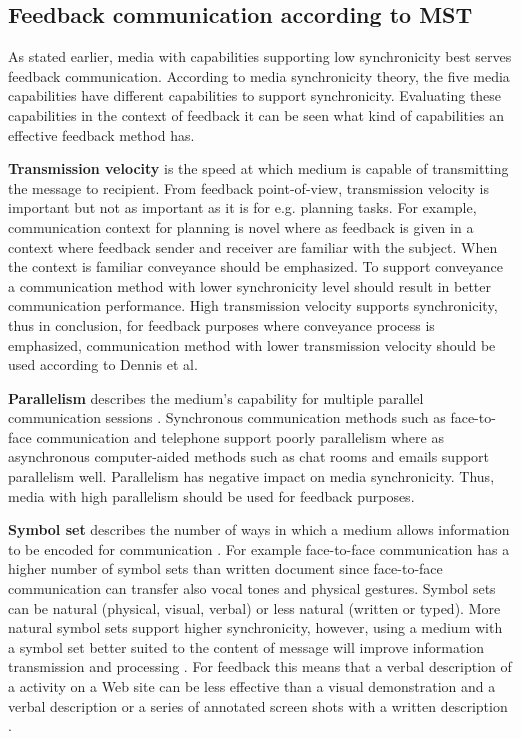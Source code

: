 \documentclass[conference]{IEEEtran}
\begin{document}
\subsection{Feedback communication according to MST}

As stated earlier, media with capabilities supporting low synchronicity best serves feedback communication. According to media synchronicity theory, the five media capabilities have different capabilities to support synchronicity. Evaluating these capabilities in the context of feedback it can be seen what kind of capabilities an effective feedback method has.

\textbf{Transmission velocity} is the speed at which medium is capable of transmitting the message to recipient. From feedback point-of-view, transmission velocity is important but not as important as it is for e.g. planning tasks. For example, communication context for planning is novel where as feedback is given in a context where feedback sender and receiver are familiar with the subject. When the context is familiar conveyance should be emphasized. To support conveyance a communication method with lower synchronicity level should result in better communication performance. High transmission velocity supports synchronicity, thus in conclusion, for feedback purposes where conveyance process is emphasized, communication method with lower transmission velocity should be used according to Dennis et al. \cite{2008dennis}

\textbf{Parallelism} describes the medium's capability for multiple parallel communication sessions \cite{2008dennis}. Synchronous communication methods such as face-to-face communication and telephone support poorly parallelism where as asynchronous computer-aided methods such as chat rooms and emails support parallelism well. Parallelism has negative impact on media synchronicity. Thus, media with high parallelism should be used for feedback purposes. \cite{2008dennis}

\textbf{Symbol set} describes the number of ways in which a medium allows information to be encoded for communication \cite{2008dennis}. For example face-to-face communication has a higher number of symbol sets than written document since face-to-face communication can transfer also vocal tones and physical gestures. Symbol sets can be natural (physical, visual, verbal) or less natural (written or typed). More natural symbol sets support higher synchronicity, however, using a medium with a symbol set better suited to the content of message will improve information transmission and processing \cite{2008dennis}. For feedback this means that a verbal description of a activity on a Web site can be less effective than a visual demonstration and a verbal description or a series of annotated screen shots with a written description \cite{2008dennis}.
\end{document}
